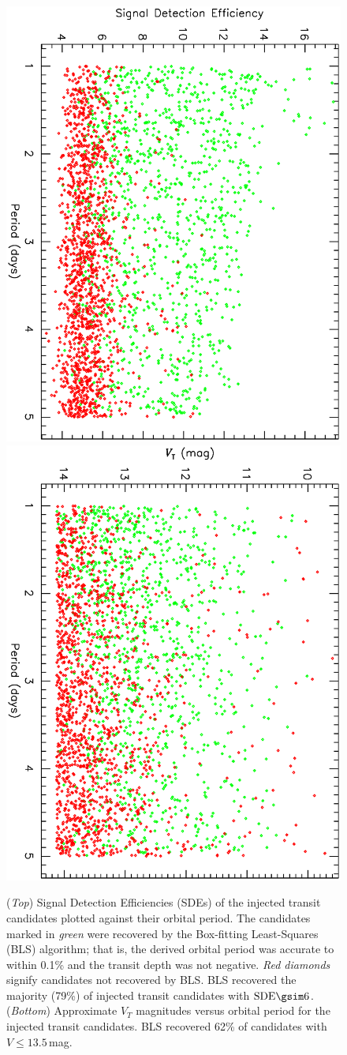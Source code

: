 \begin{figure}
\begin{center}
\centering
\includegraphics[width=.55\textwidth, angle=90]{7_comp_b} \\
\includegraphics[width=.55\textwidth, angle=90]{7_comp_a} \\
\caption[SDE and $V_{T}$ versus period for BLS-recovered transits]{%
({\it Top}) Signal Detection Efficiencies (SDEs) of the injected transit candidates plotted against their orbital period. 
The candidates marked in {\it green} were recovered by the Box-fitting Least-Squares (BLS) algorithm; that is, the derived orbital period was accurate to within 0.1\% and the transit depth was not negative. 
{\it Red diamonds} signify candidates not recovered by BLS.
BLS recovered the majority (79\%) of injected transit candidates with $\mathrm{SDE}\gsim6$. 
({\it Bottom}) Approximate $V_{T}$ magnitudes versus orbital period for the injected transit candidates.
BLS recovered 62\% of candidates with $V\leq13.5$\,mag.%
}
\label{cha:human:sec:model:fig:rec}
\end{center}
\end{figure}

